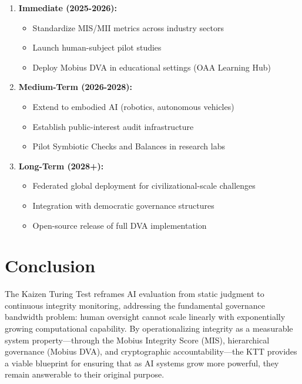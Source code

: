 \documentclass[11pt,letterpaper]{article}
\begin{document}
\begin{enumerate}
    \item \textbf{Immediate (2025-2026):}
    \begin{itemize}
        \item Standardize MIS/MII metrics across industry sectors
        \item Launch human-subject pilot studies
        \item Deploy Mobius DVA in educational settings (OAA Learning Hub)
    \end{itemize}
    
    \item \textbf{Medium-Term (2026-2028):}
    \begin{itemize}
        \item Extend to embodied AI (robotics, autonomous vehicles)
        \item Establish public-interest audit infrastructure
        \item Pilot Symbiotic Checks and Balances in research labs
    \end{itemize}
    
    \item \textbf{Long-Term (2028+):}
    \begin{itemize}
        \item Federated global deployment for civilizational-scale challenges
        \item Integration with democratic governance structures
        \item Open-source release of full DVA implementation
    \end{itemize}
\end{enumerate}

\section{Conclusion}
\label{sec:conclusion}

The Kaizen Turing Test reframes AI evaluation from static judgment to continuous integrity monitoring, addressing the fundamental governance bandwidth problem: human oversight cannot scale linearly with exponentially growing computational capability. By operationalizing integrity as a measurable system property—through the Mobius Integrity Score (MIS), hierarchical governance (Mobius DVA), and cryptographic accountability—the KTT provides a viable blueprint for ensuring that as AI systems grow more powerful, they remain answerable to their original purpose.
\end{document}
